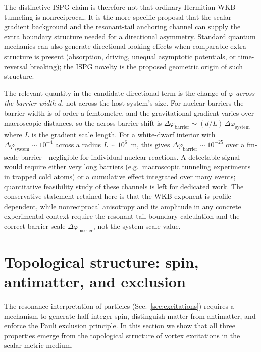 \documentclass[aps,prd,onecolumn,superscriptaddress,nofootinbib,showpacs,12pt,notitlepage]{revtex4-2}
\begin{document}
The distinctive ISPG claim is therefore not that ordinary
Hermitian WKB tunneling is nonreciprocal.  It is the more
specific proposal that the scalar-gradient background and the
resonant-tail anchoring channel can supply the extra boundary
structure needed for a directional asymmetry.  Standard
quantum mechanics can also generate directional-looking
effects when comparable extra structure is present
(absorption, driving, unequal asymptotic potentials, or
time-reversal breaking); the ISPG novelty is the proposed
geometric origin of such structure.

The relevant quantity in the candidate directional term is the
change of $\varphi$ \emph{across the barrier width} $d$, not
across the host system's size.  For nuclear barriers the
barrier width is of order a femtometre, and the gravitational
gradient varies over macroscopic distances, so the
across-barrier shift is
$\Delta\varphi_{\mathrm{barrier}}
\sim (d/L)\,\Delta\varphi_{\mathrm{system}}$ where $L$
is the gradient scale length.  For a white-dwarf
interior with $\Delta\varphi_{\mathrm{system}}\sim
10^{-4}$ across a radius $L\sim 10^{6}$~m, this gives
$\Delta\varphi_{\mathrm{barrier}}
\sim 10^{-25}$ over a fm-scale barrier---negligible
for individual nuclear reactions.  A detectable signal
would require either very long barriers (e.g.\
macroscopic tunneling experiments in trapped cold
atoms) or a cumulative effect integrated over many
events; quantitative feasibility study of these
channels is left for dedicated work.  The conservative
statement retained here is that the WKB exponent is
profile dependent, while nonreciprocal anisotropy and its
amplitude in any concrete experimental context require the
resonant-tail boundary calculation and the correct
barrier-scale $\Delta\varphi_{\mathrm{barrier}}$, not the
system-scale value.

\section{Topological structure: spin, antimatter, and exclusion}
\label{sec:topology}

The resonance interpretation of particles
(Sec.~\ref{sec:excitations}) requires a mechanism
to generate half-integer spin, distinguish matter from
antimatter, and enforce the Pauli exclusion principle.
In this section we show that all three properties
emerge from the topological structure of vortex
excitations in the scalar-metric medium.
\end{document}
